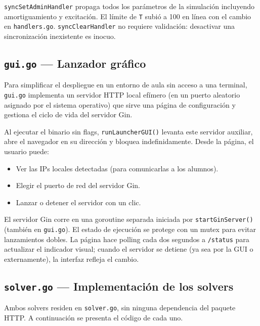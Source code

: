 \documentclass[12pt, a4paper]{article}
\begin{document}
\texttt{syncSetAdminHandler} propaga todos los parámetros de la simulación incluyendo
amortiguamiento y excitación. El límite de \texttt{T} subió a 100 en línea con el
cambio en \texttt{handlers.go}. \texttt{syncClearHandler} no requiere validación:
desactivar una sincronización inexistente es inocuo.

\subsection{\texttt{gui.go} — Lanzador gráfico}

Para simplificar el despliegue en un entorno de aula sin acceso a una terminal,
\texttt{gui.go} implementa un servidor HTTP local efímero (en un puerto aleatorio
asignado por el sistema operativo) que sirve una página de configuración y gestiona
el ciclo de vida del servidor Gin.

Al ejecutar el binario sin flags, \texttt{runLauncherGUI()} levanta este servidor
auxiliar, abre el navegador en su dirección y bloquea indefinidamente. Desde la
página, el usuario puede:

\begin{itemize}
    \item Ver las IPs locales detectadas (para comunicarlas a los alumnos).
    \item Elegir el puerto de red del servidor Gin.
    \item Lanzar o detener el servidor con un clic.
\end{itemize}

El servidor Gin corre en una goroutine separada iniciada por \texttt{startGinServer()}
(también en \texttt{gui.go}). El estado de ejecución se protege con un mutex para
evitar lanzamientos dobles. La página hace polling cada dos segundos a
\texttt{/status} para actualizar el indicador visual; cuando el servidor se detiene
(ya sea por la GUI o externamente), la interfaz refleja el cambio.

\subsection{\texttt{solver.go} — Implementación de los solvers}

Ambos solvers residen en \texttt{solver.go}, sin ninguna dependencia del paquete HTTP.
A continuación se presenta el código de cada uno.
\end{document}
